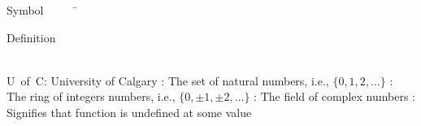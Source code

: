


\begin{tabbing}
Symbol~~~~~\= \ \ \ \ \ \ \ \ \ \ \ \ \ \ \ \ \ \ \ \ \ \ \ \ \ \ \ \ \ \ \ \ \ \ \ \  \parbox{5in}{Definition}\\

\addsymbol \mbox{U of C}: {University of Calgary}
\addsymbol \mbox{\nat}: {The set of natural numbers, i.e., $\{0,1,2,\ldots\}$}
\addsymbol \mbox{\integers}: {The ring of integers numbers, i.e., $\{0,\pm1,\pm2,\ldots\}$}
\addsymbol \mbox{\complex}: {The field of complex numbers}
\addsymbol \mbox{\uparrow}: {Signifies that function is undefined at some value}
\end{tabbing}

